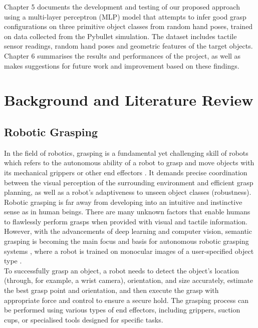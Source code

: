 \documentclass[11pt, a4paper]{report}
\begin{document}
Chapter 5 documents the development and testing of our proposed approach using a multi-layer perceptron (MLP) model that attempts to infer good grasp configurations on three primitive object classes from random hand poses, trained on data collected from the Pybullet simulation. The dataset includes tactile sensor readings, random hand poses and geometric features of the target objects.\\

Chapter 6 summarises the results and performances of the project, as well as makes suggestions for future work and improvement based on these findings.



\chapter{Background and Literature Review}\label{chap:2}


\section{Robotic Grasping}\label{sec:2.1}
In the field of robotics, grasping is a fundamental yet challenging skill of robots which refers to the autonomous ability of a robot to grasp and move objects with its mechanical grippers or other end effectors \cite{zhang2022robotic}. It demands precise coordination between the visual perception of the surrounding environment and efficient grasp planning, as well as a robot's adaptiveness to unseen object classes (robustness).\\

Robotic grasping is far away from developing into an intuitive and instinctive sense as in human beings. There are many unknown factors that enable humans to flawlessly perform grasps when provided with visual and tactile information. However, with the advancements of deep learning and computer vision, semantic grasping is becoming the main focus and basis for autonomous robotic grasping systems \cite{zhang2022robotic}, where a robot is trained on monocular images of a user-specified object type \cite{jang2017endtoend}.\\

To successfully grasp an object, a robot needs to detect the object's location (through, for example, a wrist camera), orientation, and size accurately, estimate the best grasp point and orientation, and then execute the grasp with appropriate force and control to ensure a secure hold. The grasping process can be performed using various types of end effectors, including grippers, suction cups, or specialised tools designed for specific tasks.\\
\end{document}
